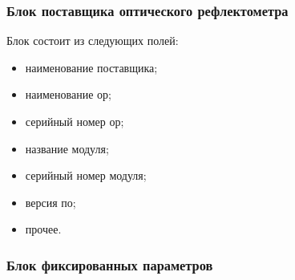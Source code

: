\subsubsection{Блок поставщика оптического рефлектометра}

Блок состоит из следующих полей:
\begin{itemize}
  \item наименование поставщика;
  \item наименование \acrshort{ор};
  \item серийный номер \acrshort{ор};
  \item название модуля;
  \item серийный номер модуля;
  \item версия \acrshort{по};
  \item прочее.
\end{itemize}

\subsubsection{Блок фиксированных параметров}
\label{fixed_params_block}

